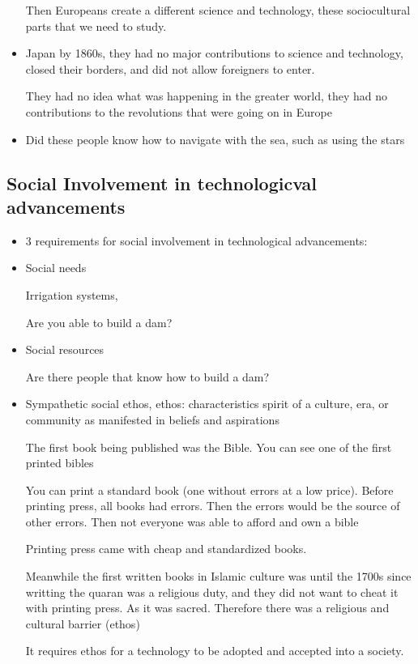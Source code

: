 \documentclass{article}
\begin{document}
\begin{itemize}
    Then Europeans create a different science and technology, these sociocultural
    parts that we need to study.
  \item Japan by 1860s, they had no major contributions to science and technology,
    closed their borders, and did not allow foreigners to enter.

    They had no idea what was happening in the greater world,
    they had no contributions to the revolutions that were going on in Europe
  \item Did these people know how to navigate with the sea, such
    as using the stars
\end{itemize}

\subsection{Social Involvement in technologicval advancements}
\begin{itemize}
  \item 3 requirements for social involvement in technological advancements:
  \item Social needs

   Irrigation systems,

  Are you able to build a dam?
  \item Social resources

    Are there people that know how to build a dam?
  \item Sympathetic social ethos,
    ethos: characteristics spirit of a culture, era, or community as manifested in beliefs and aspirations

    The first book being published was the Bible.
    You can see one of the first printed bibles

    You can print a standard book (one without errors at a low price).
    Before printing press, all books had errors. Then the errors
    would be the source of other errors. Then not everyone was able to afford and own a bible

    Printing press came with cheap and standardized books.

    Meanwhile the first written books in Islamic culture was until the 1700s since
    writting the quaran was a religious duty, and they did not want to cheat it with printing press.
    As it was sacred. Therefore there was a religious and cultural barrier (ethos)

    It requires ethos for a technology to be adopted and accepted into a society.
\end{itemize}
\end{document}
